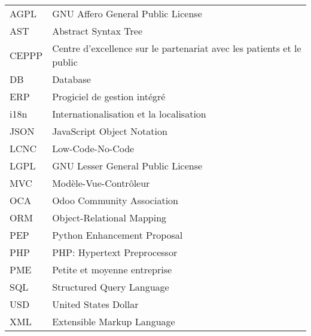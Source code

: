 \chapter*{\abbrevname}
\pagestyle{pagenumber}
%
\begin{acronym}
\end{acronym}
%
\begin{longtable}{lp{5in}}
AGPL      & GNU Affero General Public License\\
AST       & Abstract Syntax Tree\\
CEPPP     & Centre d'excellence sur le partenariat avec les patients et le public\\
DB        & Database\\
ERP       & Progiciel de gestion intégré\\
i18n      & Internationalisation et la localisation\\
JSON      & JavaScript Object Notation\\
LCNC      & Low-Code-No-Code\\
LGPL      & GNU Lesser General Public License\\
MVC       & Modèle-Vue-Contrôleur\\
OCA       & Odoo Community Association\\
ORM       & Object-Relational Mapping\\
PEP       & Python Enhancement Proposal\\
PHP       & PHP: Hypertext Preprocessor\\
PME       & Petite et moyenne entreprise\\
SQL       & Structured Query Language\\
USD       & United States Dollar\\
XML       & Extensible Markup Language\\

\end{longtable}
